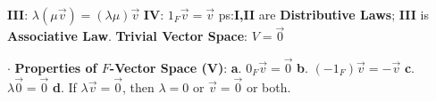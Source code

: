 \documentclass[9pt]{article}
\begin{document}
\quad \quad \quad \quad \textbf{III}: $\lambda(\mu\vec{v})=(\lambda\mu)\vec{v}$ \quad \textbf{IV}: $1_F\vec{v}=\vec{v}$ \hspace{30pt} {\scriptsize ps:\textbf{I,II} are \textbf{Distributive Laws}; \textbf{III} is \textbf{Associative Law}. \hspace{30pt} \textbf{Trivial Vector Space}: $V=\vec{0}$}

$\cdot$ \textbf{Properties of $F$-Vector Space (V)}: \textbf{a}. $0_F\vec{v}=\vec{0}$ \quad \textbf{b}. $(-1_F)\vec{v}=-\vec{v}$ \quad \textbf{c}. $\lambda\vec{0}=\vec{0}$ \quad \textbf{d}. If $\lambda\vec{v}=\vec{0}$, then $\lambda=0$ or $\vec{v}=\vec{0}$ or both.
\end{document}
